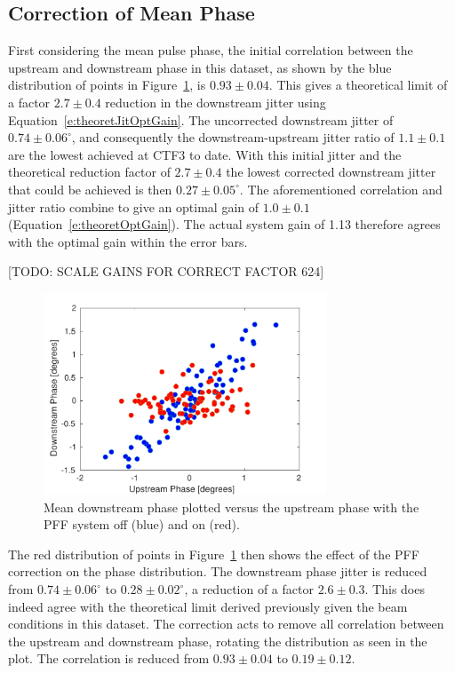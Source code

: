 \subsection{Correction of Mean Phase}
\label{ss:bestMeanJitter}

First considering the mean pulse phase, the initial correlation between the upstream and downstream phase in this dataset, as shown by the blue distribution of points in Figure~\ref{f:BestFF_Real}, is \(0.93\pm0.04\). This gives a theoretical limit of a factor \(2.7\pm0.4\) reduction in the downstream jitter using Equation~\ref{e:theoretJitOptGain}. The uncorrected downstream jitter of \(0.74\pm0.06^\circ\), and consequently the downstream-upstream jitter ratio of \(1.1\pm0.1\) are the lowest achieved at CTF3 to date. With this initial jitter and the theoretical reduction factor of \(2.7\pm0.4\) the lowest corrected downstream jitter that could be achieved is then \(0.27\pm0.05^\circ\). The aforementioned correlation and jitter ratio combine to give an optimal gain of \(1.0\pm0.1\) (Equation~\ref{e:theoretOptGain}). The actual system gain of 1.13 therefore agrees with the optimal gain within the error bars.

[TODO: SCALE GAINS FOR CORRECT FACTOR 624]

\begin{figure}
  \centering
  \includegraphics[width=0.75\textwidth]{Figures/feedforward/BestFF_Real}
  \caption{Mean downstream phase plotted versus the upstream phase with the PFF system off (blue) and on (red).}
  \label{f:BestFF_Real}
\end{figure}

The red distribution of points in Figure~\ref{f:BestFF_Real} then shows the effect of the PFF correction on the phase distribution. The downstream phase jitter is reduced from \(0.74\pm0.06^\circ\) to \(0.28\pm0.02^\circ\), a reduction of a factor \(2.6\pm0.3\).  This does indeed agree with the theoretical limit derived previously given the beam conditions in this dataset. The correction acts to remove all correlation between the upstream and downstream phase, rotating the distribution as seen in the plot. The correlation is reduced from \(0.93\pm0.04\) to \(0.19\pm0.12\).

